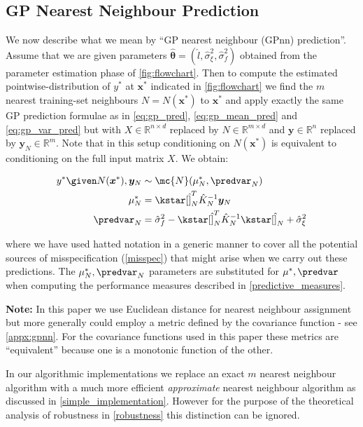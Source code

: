 \subsection{GP Nearest Neighbour Prediction}
\label{exact_NN_prediction}
We now describe what we mean by ``GP nearest neighbour (GPnn) prediction''. Assume that we are given parameters $\hat{\bm{\theta}} = (\hat{l},\hat{\sigma}_\xi^2,\hat{\sigma}_f^2)$ obtained from the parameter estimation phase of \autoref{fig:flowchart}. Then to compute the estimated pointwise-distribution of $y^*$ at $\bm{x}^*$ indicated in \autoref{fig:flowchart} we find the $m$ nearest training-set neighbours $N = N(\bm{x}^*)$ to $\bm{x}^*$ and apply exactly the same GP prediction formulae as in \eqref{eq:gp_pred}, \eqref{eq:gp_mean_pred} and \eqref{eq:gp_var_pred} but with $X \in \mathbb{R}^{n \times d}$ replaced by $N \in \mathbb{R}^{m \times d}$ and $\bm{y} \in \mathbb{R}^n $ replaced by $\bm{y}_N \in \mathbb{R}^m$. Note that in this setup conditioning on \(N(\bm{x}^*)\) is equivalent to conditioning on the full input matrix \(X\). We obtain:


\begin{align}
  y^*\given N(\bm{x}^*),\bm{y}_N &\sim \mc{N}(\mu_N^*,\predvar_N)\label{eq:gpnn_pred} \\
  \mu_N^* &= \kstar[\hat]_N^T \hat{K}_N^{-1}\bm{y}_N \label{eq:gpnn_mean_pred}\\
  \predvar_N &= \hat{\sigma}_f^2 - \kstar[\hat]_N^T \hat{K}_N^{-1}\kstar[\hat]_N + \hat{\sigma}_\xi^2 \label{eq:gpnn_var_pred}
\end{align}

where we have used hatted notation in a generic manner to cover all the potential sources of misspecification (\ref{misspec}) that might arise when we carry out these predictions. The $\mu_N^*,\predvar_N$ parameters are substituted for $\mu^*,\predvar$ when computing the performance measures described in \autoref{predictive_measures}.

\textbf{Note:} In this paper we use Euclidean distance for nearest neighbour assignment but more generally could employ a metric defined by the covariance function - see \ref{appx:gpnn}. For the covariance functions used in this paper these metrics are ``equivalent'' because one is a monotonic function of the other.


In our algorithmic implementations we replace an exact $m$ nearest neighbour algorithm with a much more efficient {\it approximate} nearest neighbour algorithm as discussed in \autoref{simple_implementation}. However for the purpose of the theoretical analysis of robustness in \autoref{robustness} this distinction can be ignored. 

